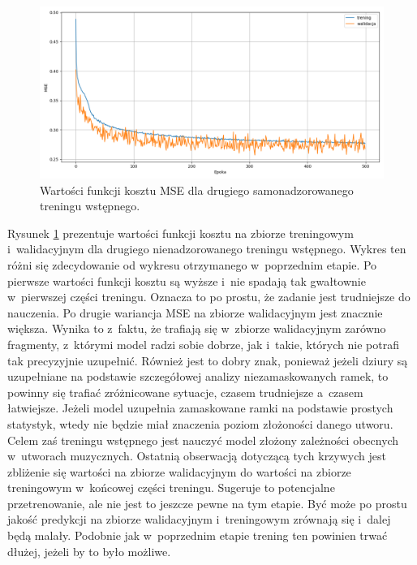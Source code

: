 \begin{figure}
    \centering
    \includegraphics[width=1.0\textwidth]{./images/mae2_loss.png}
    \caption{Wartości funkcji kosztu MSE dla drugiego samonadzorowanego treningu wstępnego.}
    \label{fig:mae2_loss}
\end{figure}

Rysunek \ref{fig:mae2_loss} prezentuje wartości funkcji kosztu na zbiorze treningowym i~walidacyjnym dla drugiego nienadzorowanego treningu wstępnego. Wykres ten różni się zdecydowanie od wykresu otrzymanego w~poprzednim etapie. Po pierwsze wartości funkcji kosztu są wyższe i~nie spadają tak gwałtownie w~pierwszej części treningu. Oznacza to po prostu, że zadanie jest trudniejsze do nauczenia. Po drugie wariancja MSE na zbiorze walidacyjnym jest znacznie większa. Wynika to z~faktu, że trafiają się w~zbiorze walidacyjnym zarówno fragmenty, z~którymi model radzi sobie dobrze, jak i~takie, których nie potrafi tak precyzyjnie uzupełnić. Również jest to dobry znak, ponieważ jeżeli dziury są uzupełniane na podstawie szczegółowej analizy niezamaskowanych ramek, to powinny się trafiać zróżnicowane sytuacje, czasem trudniejsze a~czasem łatwiejsze. Jeżeli model uzupełnia zamaskowane ramki na podstawie prostych statystyk, wtedy nie będzie miał znaczenia poziom złożoności danego utworu. Celem zaś treningu wstępnego jest nauczyć model złożony zależności obecnych w~utworach muzycznych. Ostatnią obserwacją dotyczącą tych krzywych jest zbliżenie się wartości na zbiorze walidacyjnym do wartości na zbiorze treningowym w~końcowej części treningu. Sugeruje to potencjalne przetrenowanie, ale nie jest to jeszcze pewne na tym etapie. Być może po prostu jakość predykcji na zbiorze walidacyjnym i~treningowym zrównają się i~dalej będą malały. Podobnie jak w~poprzednim etapie trening ten powinien trwać dłużej, jeżeli by to było możliwe.

